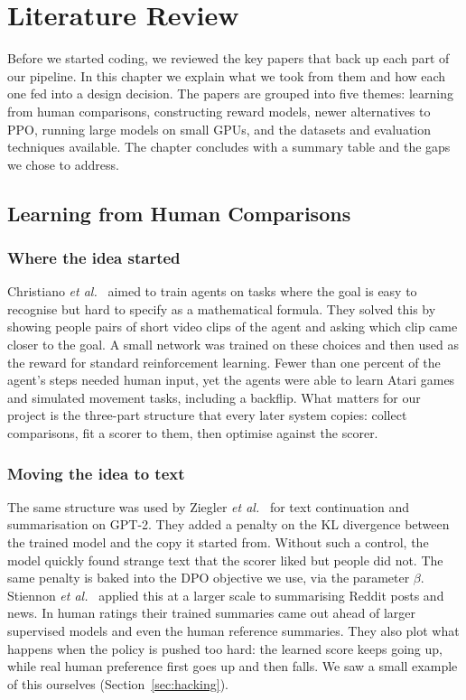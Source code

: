 \chapter{Literature Review}
\label{ch:lit}

Before we started coding, we reviewed the key papers that back up each part of our pipeline. In this chapter we explain what we took from them and how each one fed into a design decision. The papers are grouped into five themes: learning from human comparisons, constructing reward models, newer alternatives to PPO, running large models on small GPUs, and the datasets and evaluation techniques available. The chapter concludes with a summary table and the gaps we chose to address.

\section{Learning from Human Comparisons}
\label{sec:lit-rlhf}

\subsection{Where the idea started}
Christiano \emph{et al.}~\cite{christiano2017deep} aimed to train agents on tasks where the goal is easy to recognise but hard to specify as a mathematical formula. They solved this by showing people pairs of short video clips of the agent and asking which clip came closer to the goal. A small network was trained on these choices and then used as the reward for standard reinforcement learning. Fewer than one percent of the agent's steps needed human input, yet the agents were able to learn Atari games and simulated movement tasks, including a backflip. What matters for our project is the three-part structure that every later system copies: collect comparisons, fit a scorer to them, then optimise against the scorer.

\subsection{Moving the idea to text}
The same structure was used by Ziegler \emph{et al.}~\cite{ziegler2019finetuning} for text continuation and summarisation on GPT-2. They added a penalty on the KL divergence between the trained model and the copy it started from. Without such a control, the model quickly found strange text that the scorer liked but people did not. The same penalty is baked into the DPO objective we use, via the parameter $\beta$. Stiennon \emph{et al.}~\cite{stiennon2020summarize} applied this at a larger scale to summarising Reddit posts and news. In human ratings their trained summaries came out ahead of larger supervised models and even the human reference summaries. They also plot what happens when the policy is pushed too hard: the learned score keeps going up, while real human preference first goes up and then falls. We saw a small example of this ourselves (Section~\ref{sec:hacking}).

